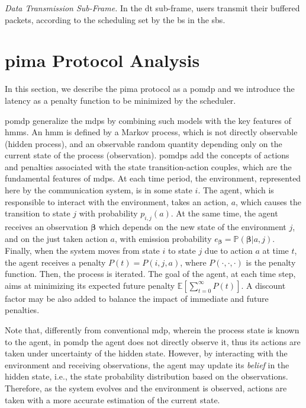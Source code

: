 \documentclass[conference]{IEEEtran}
\begin{document}
\vspace{5pt}\noindent\emph{Data Transmission Sub-Frame.}
In the \ac{dt} sub-frame, users transmit their buffered packets, according to the scheduling set by the \ac{bs} in the \acp{sb}.

\section{\ac{pima} Protocol Analysis}\label{sec:POMDPmodeling}

In this section, we describe the \ac{pima} protocol as a \ac{pomdp} and we introduce the latency as a penalty function to be minimized by the scheduler.

\Acs{pomdp} generalize the \acp{mdp} by combining such models with the key features of \acp{hmm}. 
An \ac{hmm} is defined by a Markov process, which is not directly observable (hidden process), and an observable random quantity depending only on the current state of the process (observation).  \Acp{pomdp} add the concepts of actions and penalties associated with the state transition-action couples, which are the fundamental features of \acp{mdp}. At each time period, the environment, represented here by the communication system, is in some state $i$. The agent, which is responsible to interact with the environment, takes an action, $a$, which causes the transition to state $j$ with probability $p_{i,j}(a)$. At the same time, the agent receives an observation $\bm{\beta}$  which depends on the new state of the environment $j$, and on the just taken action $a$, with emission probability $e_{\bm{\beta}} = \mathbb{P}(\bm{\beta}|a,j)$. Finally, when the system moves from state $i$ to state $j$ due to action $a$ at time $t$, the agent receives a penalty $P(t) = P(i, j, a)$, where $P(\cdot,\cdot,\cdot)$ is the penalty function. Then, the process is iterated.
The goal of the agent, at each time step, aims at minimizing its expected future penalty $\mathbb{E}\left[\sum _{t=0}^{\infty }P(t)\right]$. A discount factor may be also added to balance the impact of immediate and future penalties. 

Note that, differently from conventional \ac{mdp}, wherein the process state is known to the agent, in \ac{pomdp} the agent does not directly observe it, thus its actions are taken under uncertainty of the hidden state. 
However, by interacting with the environment and receiving observations, the agent may update its \textit{belief} in the hidden state, i.e., the state probability distribution based on the observations. Therefore, as the system evolves and the environment is observed, actions are taken with a more accurate estimation of the current state.
\end{document}
